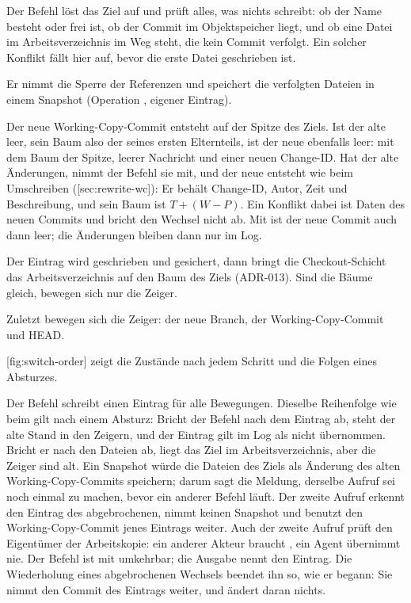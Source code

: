\startitemize[n]
\item Der Befehl löst das Ziel auf und prüft alles, was nichts schreibt: ob der Name besteht
oder frei ist, ob der Commit im Objektspeicher liegt, und ob eine Datei im Arbeitsverzeichnis im
Weg steht, die kein Commit verfolgt.
Ein solcher Konflikt fällt hier auf, bevor die erste Datei geschrieben ist.
\item Er nimmt die Sperre der Referenzen und speichert die verfolgten Dateien in einem Snapshot
(Operation , eigener Eintrag).
\item Der neue Working-Copy-Commit entsteht auf der Spitze des Ziels.
Ist der alte leer, sein Baum also der seines ersten Elternteils, ist der neue ebenfalls leer:
mit dem Baum der Spitze, leerer Nachricht und einer neuen Change-ID.
Hat der alte Änderungen, nimmt der Befehl sie mit, und der neue entsteht wie beim Umschreiben
([sec:rewrite-wc]): Er behält Change-ID, Autor, Zeit und Beschreibung, und sein
Baum ist $T + (W - P)$.
Ein Konflikt dabei ist Daten des neuen Commits und bricht den Wechsel nicht ab.
Mit  ist der neue Commit auch dann leer; die Änderungen bleiben dann nur im Log.
\item Der Eintrag  wird geschrieben und gesichert, dann bringt die Checkout-Schicht
das Arbeitsverzeichnis auf den Baum des Ziels (ADR-013).
Sind die Bäume gleich, bewegen sich nur die Zeiger.
\item Zuletzt bewegen sich die Zeiger: der neue Branch, der Working-Copy-Commit und HEAD.
\stopitemize

[fig:switch-order] zeigt die Zustände nach jedem Schritt und die Folgen eines
Absturzes.

\startplacefigure[title={Reihenfolge von \type{switch}, mit den Zuständen nach einem Absturz},
    reference=fig:switch-order,location=here]
\stopplacefigure

Der Befehl schreibt einen Eintrag für alle Bewegungen.
Dieselbe Reihenfolge wie beim  gilt nach einem Absturz:
Bricht der Befehl nach dem Eintrag ab, steht der alte Stand in den Zeigern, und der Eintrag
gilt im Log als nicht übernommen.
Bricht er nach den Dateien ab, liegt das Ziel im Arbeitsverzeichnis, aber die Zeiger sind alt.
Ein Snapshot würde die Dateien des Ziels als Änderung des alten Working-Copy-Commits speichern;
darum sagt die Meldung, derselbe Aufruf sei noch einmal zu machen, bevor ein anderer Befehl läuft.
Der zweite Aufruf erkennt den Eintrag des abgebrochenen, nimmt keinen Snapshot und benutzt den
Working-Copy-Commit jenes Eintrags weiter.
Auch der zweite Aufruf prüft den Eigentümer der Arbeitskopie:
ein anderer Akteur braucht , ein Agent übernimmt nie.
Der Befehl ist mit  umkehrbar; die Ausgabe nennt den Eintrag.
Die Wiederholung eines abgebrochenen Wechsels beendet ihn so, wie er begann:
Sie nimmt den Commit des Eintrags weiter, und  ändert daran nichts.

